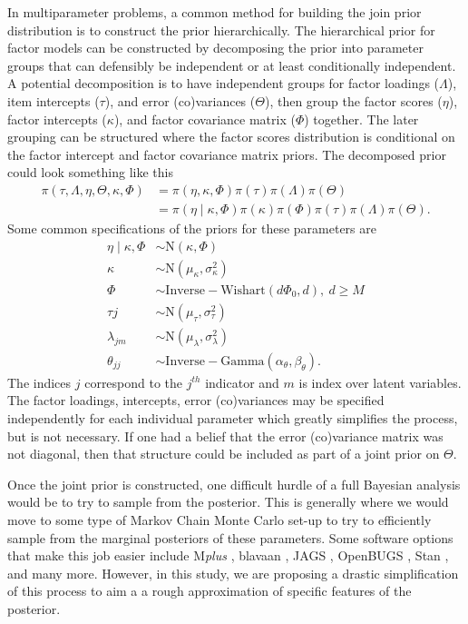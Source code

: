 \documentclass[man, noextraspace, floatsintext, 12pt]{apa7}
\begin{document}
In multiparameter problems, a common method for building the join prior distribution is to construct the prior hierarchically.
The hierarchical prior for factor models can be constructed by decomposing the prior into parameter groups that can defensibly be independent or at least conditionally independent.
A potential decomposition is to have independent groups for factor loadings ($\Lambda$), item intercepts ($\tau$), and error (co)variances ($\Theta$), then group the factor scores ($\eta$), factor intercepts ($\kappa$), and factor covariance matrix ($\Phi$) together.
The later grouping can be structured where the factor scores distribution is conditional on the factor intercept and factor covariance matrix priors.
The decomposed prior could look something like this
\begin{align*}
\pi\left(\tau, \Lambda, \eta,\Theta, \kappa, \Phi\right) &= \pi\left(\eta, \kappa, \Phi\right)\pi\left(\tau\right)\pi\left(\Lambda\right) \pi\left(\Theta\right)\\
&= \pi\left(\eta\mid \kappa, \Phi\right) \pi\left(\kappa\right)  \pi\left(\Phi\right) \pi\left(\tau\right)\pi\left(\Lambda\right) \pi\left(\Theta\right).
\end{align*}
Some common specifications of the priors for these parameters are
\begin{align*}
\eta\mid \kappa, \Phi &\sim \mathrm{N}(\kappa,\Phi)\\
\kappa &\sim \mathrm{N}(\mu_{\kappa}, \sigma^2_{\kappa})\\
\Phi &\sim \mathrm{Inverse-Wishart}(d\Phi_0, d),\ d \geq M\\
\tau{j} &\sim \mathrm{N}(\mu_{\tau}, \sigma^2_{\tau})\\
\lambda_{jm} &\sim \mathrm{N}(\mu_{\lambda}, \sigma^2_{\lambda})\\
\theta_{jj} &\sim \mathrm{Inverse-Gamma}(\alpha_{\theta}, \beta_{\theta}).
\end{align*}
The indices $j$ correspond to the $j^{th}$ indicator and $m$ is index over latent variables.
The factor loadings, intercepts, error (co)variances may be specified independently for each individual parameter which greatly simplifies the process, but is not necessary.
If one had a belief that the error (co)variance matrix was not diagonal, then that structure could be included as part of a joint prior on $\Theta$.

Once the joint prior is constructed, one difficult hurdle of a full Bayesian analysis would be to try to sample from the posterior.
This is generally where we would move to some type of Markov Chain Monte Carlo set-up to try to efficiently sample from the marginal posteriors of these parameters.
Some software options that make this job easier include M\textit{plus} \citep{Mplus}, blavaan \citep{blavaan}, JAGS \citep{jags}, OpenBUGS \citep{bugs}, Stan \citep{Stan}, and many more.
However, in this study, we are proposing a drastic simplification of this process to aim a a rough approximation of specific features of the posterior.
\end{document}
